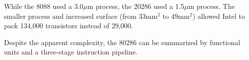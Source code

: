 \documentclass[book.tex]{subfiles}
\begin{document}
\par
While the 8088 used a 3.0$\mu$m process, the 20286 used a 1.5$\mu$m process. The smaller process and increased surface (from 33mm$^2$ to 49mm$^2$) allowed Intel to pack 134,000 transistors instead of 29,000.\\


\par \vspace{-1pt}
\begin{minipage}{0.48\textwidth}
\centering
{} 

\end{minipage}
\hfill
\begin{minipage}{0.48\textwidth}
\centering
{}
\end{minipage}



 \pagebreak

\par Despite the apparent complexity, the 80286 can be summarized by functional units and a three-stage instruction pipeline.
\end{document}
